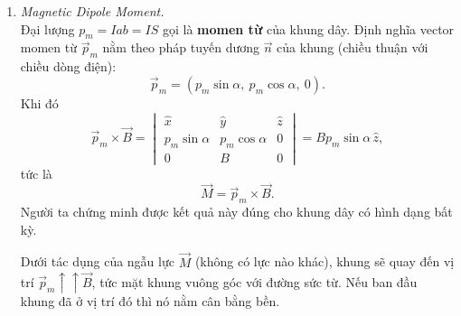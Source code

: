 \begin{enumerate}
\begin{figure}[htbp]
\begin{tikzpicture}[scale=1.5, x={(-0.55cm,-0.42cm)}, y={(1cm,0cm)}, z={(0cm,1cm)},
        vec/.style={-{Stealth}, thick}]
    \end{tikzpicture}
\end{figure}
Chọn hệ trục với $\vec{B} = (0, B, 0)$ và cạnh $MN$, $PQ$ song song $Oz$. Khi đó $\vec{MN} = (0,0,-a)$, $\vec{PQ} = (0,0,a)$ và
\[
\vec{F}_1 = I\,\vec{MN} \times \vec{B} =
\begin{vmatrix}
\hat{x} & \hat{y} & \hat{z}\\
0 & 0 & -aI\\
0 & B & 0
\end{vmatrix}
= IaB\,\hat{x},
\qquad
\vec{F}_2 = I\,\vec{PQ} \times \vec{B} = -IaB\,\hat{x}.
\]
Gọi $\alpha$ là góc giữa $Ox$ và mặt khung. Điểm đặt của hai lực là
\[
A\left(\tfrac{b}{2}\cos\alpha,\ -\tfrac{b}{2}\sin\alpha,\ 0\right),
\qquad
B\left(-\tfrac{b}{2}\cos\alpha,\ \tfrac{b}{2}\sin\alpha,\ 0\right).
\]
Hai lực $\vec{F}_1$, $\vec{F}_2$ tạo thành một ngẫu lực có momen
\begin{align*}
\vec{M} &= \vec{OA} \times \vec{F}_1 + \vec{OB} \times \vec{F}_2\\
&= \left(0,0,\tfrac{IaBb}{2}\sin\alpha\right) + \left(0,0,\tfrac{IaBb}{2}\sin\alpha\right)
= (0,\ 0,\ IabB\sin\alpha).
\end{align*}

\item \textit{Magnetic Dipole Moment.}\\
Đại lượng $p_m = Iab = IS$ gọi là \textbf{momen từ} của khung dây. Định nghĩa vector momen từ $\vec{p}_m$ nằm theo pháp tuyến dương $\vec{n}$ của khung (chiều thuận với chiều dòng điện):
\[
\vec{p}_m = (p_m\sin\alpha,\ p_m\cos\alpha,\ 0).
\]
Khi đó
\[
\vec{p}_m \times \vec{B} =
\begin{vmatrix}
\hat{x} & \hat{y} & \hat{z}\\
p_m\sin\alpha & p_m\cos\alpha & 0\\
0 & B & 0
\end{vmatrix}
= B p_m\sin\alpha\,\hat{z},
\]
tức là
\[
\boxed{\vec{M} = \vec{p}_m \times \vec{B}}.
\]
Người ta chứng minh được kết quả này đúng cho khung dây có hình dạng bất kỳ.
\begin{remark}
Dưới tác dụng của ngẫu lực $\vec{M}$ (không có lực nào khác), khung sẽ quay đến vị trí $\vec{p}_m \uparrow\uparrow \vec{B}$, tức mặt khung vuông góc với đường sức từ. Nếu ban đầu khung đã ở vị trí đó thì nó nằm cân bằng bền.
\end{remark}
\end{enumerate}

